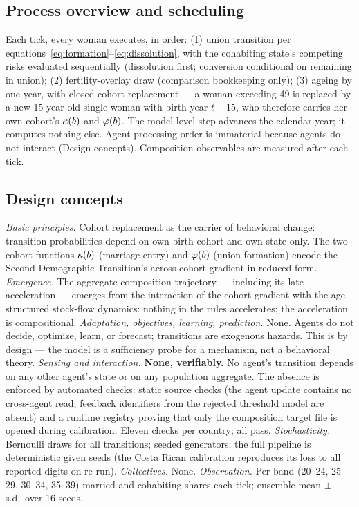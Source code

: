 \subsection{Process overview and scheduling}

Each tick, every woman executes, in order: (1) union transition per
equations~\eqref{eq:formation}--\eqref{eq:dissolution}, with the cohabiting
state's competing risks evaluated sequentially (dissolution first; conversion
conditional on remaining in union); (2) fertility-overlay
draw (comparison bookkeeping only); (3) ageing by one year, with closed-cohort
replacement --- a woman exceeding 49 is replaced by a new 15-year-old single
woman with birth year $t-15$, who therefore carries her own cohort's $\kappa(b)$ and
$\varphi(b)$. The model-level step advances the calendar year; it computes nothing
else. Agent processing order is immaterial because agents do not interact
(Design concepts). Composition observables are measured after each tick.

\subsection{Design concepts}

\emph{Basic principles.} Cohort replacement as the carrier of behavioral
change: transition probabilities depend on own birth cohort and own state only.
The two cohort functions $\kappa(b)$ (marriage entry) and $\varphi(b)$ (union formation)
encode the Second Demographic Transition's across-cohort gradient in reduced
form.
\emph{Emergence.} The aggregate composition trajectory --- including its late
acceleration --- emerges from the interaction of the cohort gradient with the
age-structured stock-flow dynamics: nothing in the rules accelerates; the
acceleration is compositional.
\emph{Adaptation, objectives, learning, prediction.} None. Agents do not
decide, optimize, learn, or forecast; transitions are exogenous hazards. This
is by design --- the model is a sufficiency probe for a mechanism, not a
behavioral theory.
\emph{Sensing and interaction.} \textbf{None, verifiably.} No agent's
transition depends on any other agent's state or on any population aggregate.
The absence is enforced by automated checks: static source checks (the agent
update contains no cross-agent read; feedback identifiers from the rejected
threshold model are absent) and a runtime registry proving that only the
composition target file is opened during calibration. Eleven checks per
country; all pass.
\emph{Stochasticity.} Bernoulli draws for all transitions; seeded generators;
the full pipeline is deterministic given seeds (the Costa Rican calibration
reproduces its loss to all reported digits on re-run).
\emph{Collectives.} None.
\emph{Observation.} Per-band (20--24, 25--29, 30--34, 35--39) married and
cohabiting shares each tick; ensemble mean $\pm$ s.d.\ over 16 seeds.

